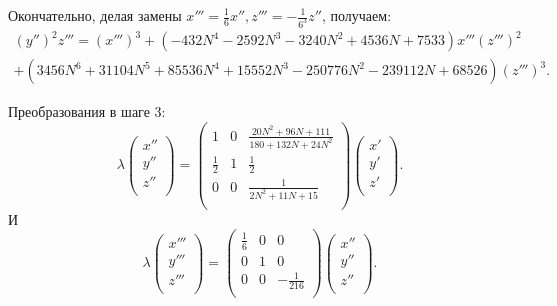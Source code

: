 \documentclass[a4paper,12pt]{article}
\theoremstyle{definition}
\begin{document}
\begin{itemize}[leftmargin=0.6cm]
        Окончательно, делая замены \(x''' = \frac{1}{6} x'', z''' =
        -\frac{1}{6^3} z''\), получаем:
        \begin{multline*}
            \left( y'' \right)^2 z''' = \left( x''' \right)^3  +  \left(-432 N^4
            - 2592 N^3 - 3240 N^2 + 4536 N + 7533\right) x''' \left( z'''
            \right)^2 \\ 
            +  \left(3456 N^6 + 31104 N^5 + 85536 N^4 + 15552 N^3 -
            250776 N^2 - 239112 N + 68526 \right) \left( z''' \right)^3
        .\end{multline*}

        Преобразования в шаге 3:
        \[
        \lambda \begin{pmatrix}
            x'' \\
            y'' \\
            z'' \\
        \end{pmatrix} = 
        \begin{pmatrix}
            1 & 0 & \frac{20 N^2 + 96 N + 111}{180 + 132 N + 24 N^2} \\
            \frac{1}{2} & 1 & \frac{1}{2} \\
            0 & 0 & \frac{1}{2 N^2 + 11 N + 15} \\
        \end{pmatrix}
        \begin{pmatrix}
            x' \\
            y' \\
            z' \\
        \end{pmatrix}
        .\] 
        И
        \[
        \lambda \begin{pmatrix}
            x''' \\
            y''' \\
            z''' \\
        \end{pmatrix} = 
        \begin{pmatrix}
            \frac{1}{6} & 0 & 0 \\
            0 & 1 & 0 \\
            0 & 0 & -\frac{1}{216} \\
        \end{pmatrix}
        \begin{pmatrix}
            x'' \\
            y'' \\
            z'' \\
        \end{pmatrix}
        .\] 
    \end{itemize}
\end{document}
